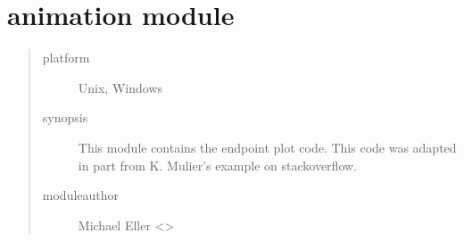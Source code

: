 \documentclass[letterpaper,10pt,english]{sphinxmanual}
\begin{document}
\section{animation module}
\label{\detokenize{animation:module-animation}}\label{\detokenize{animation:animation-module}}\label{\detokenize{animation::doc}}\begin{quote}\begin{description}
\item[{platform}] \leavevmode
Unix, Windows

\item[{synopsis}] \leavevmode
This module contains the endpoint plot code. This code was adapted in part from K. Mulier’s
example on stackoverflow.

\item[{moduleauthor}] \leavevmode
Michael Eller \textless{}\textgreater{}

\end{description}\end{quote}
\end{document}
